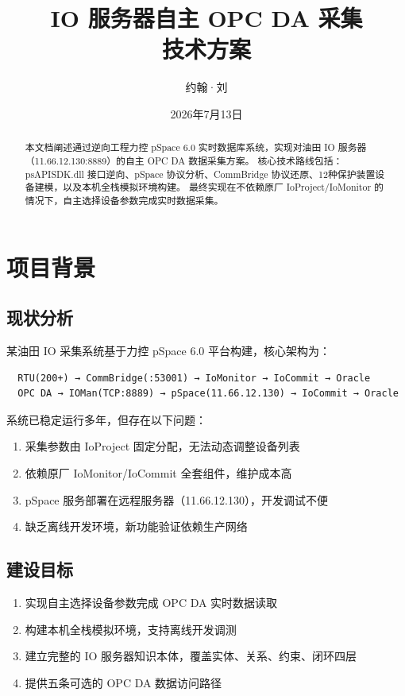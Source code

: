 \documentclass[12pt,a4paper]{ctexart}
\title{\textbf{IO 服务器自主 OPC DA 采集\\技术方案}}
\author{约翰·刘}
\date{2026年7月13日}
\begin{document}
\maketitle
\begin{abstract}
本文档阐述通过逆向工程力控 pSpace 6.0 实时数据库系统，实现对油田 IO 服务器（11.66.12.130:8889）的自主 OPC DA 数据采集方案。
核心技术路线包括：psAPISDK.dll 接口逆向、pSpace 协议分析、CommBridge 协议还原、12种保护装置设备建模，以及本机全栈模拟环境构建。
最终实现在不依赖原厂 IoProject/IoMonitor 的情况下，自主选择设备参数完成实时数据采集。
\end{abstract}

\section{项目背景}

\subsection{现状分析}
某油田 IO 采集系统基于力控 pSpace 6.0 平台构建，核心架构为：

\begin{verbatim}
  RTU(200+) → CommBridge(:53001) → IoMonitor → IoCommit → Oracle
  OPC DA → IOMan(TCP:8889) → pSpace(11.66.12.130) → IoCommit → Oracle
\end{verbatim}

系统已稳定运行多年，但存在以下问题：
\begin{enumerate}[leftmargin=*]
  \item 采集参数由 IoProject 固定分配，无法动态调整设备列表
  \item 依赖原厂 IoMonitor/IoCommit 全套组件，维护成本高
  \item pSpace 服务部署在远程服务器（11.66.12.130），开发调试不便
  \item 缺乏离线开发环境，新功能验证依赖生产网络
\end{enumerate}

\subsection{建设目标}
\begin{enumerate}[leftmargin=*]
  \item 实现自主选择设备参数完成 OPC DA 实时数据读取
  \item 构建本机全栈模拟环境，支持离线开发调测
  \item 建立完整的 IO 服务器知识本体，覆盖实体、关系、约束、闭环四层
  \item 提供五条可选的 OPC DA 数据访问路径
\end{enumerate}
\end{document}
